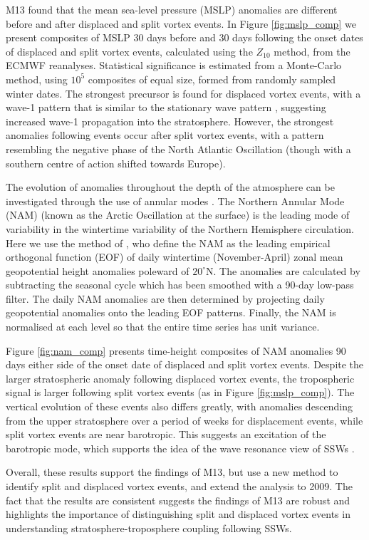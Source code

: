 M13 found that the mean sea-level pressure (MSLP) anomalies are different before
and after displaced and split vortex events. In Figure \ref{fig:mslp_comp} we
present composites of MSLP 30 days before and 30 days following the onset dates
of displaced and split vortex events, calculated using the $Z_{10}$ method, from
the ECMWF reanalyses. Statistical significance is estimated from a Monte-Carlo
method, using $10^{5}$ composites of equal size, formed from randomly sampled
winter dates. The strongest precursor is found for displaced vortex events, with
a wave-1 pattern that is similar to the stationary wave pattern
\citep[e.g.][]{Garfinkel2008}, suggesting increased wave-1 propagation into the
stratosphere. However, the strongest anomalies following events occur after
split vortex events, with a pattern resembling the negative phase of the North
Atlantic Oscillation (though with a southern centre of action shifted towards
Europe).

The evolution of anomalies throughout the depth of the atmosphere can be
investigated through the use of annular modes \citep[e.g.][]{Baldwin2001a}. The
Northern Annular Mode (NAM) (known as the Arctic Oscillation at the surface) is
the leading mode of variability in the wintertime variability of the Northern
Hemisphere circulation. Here we use the method of \citep{Baldwin2009}, who
define the NAM as the leading empirical orthogonal function (EOF) of daily
wintertime (November-April) zonal mean geopotential height anomalies poleward of
$20^{\circ}$N. The anomalies are calculated by subtracting the seasonal cycle
which has been smoothed with a 90-day low-pass filter. The daily NAM anomalies
are then determined by projecting daily geopotential anomalies onto the leading
EOF patterns. Finally, the NAM is normalised at each level so that the entire
time series has unit variance.

Figure \ref{fig:nam_comp} presents time-height composites of NAM anomalies 90
days either side of the onset date of displaced and split vortex events. Despite
the larger stratospheric anomaly following displaced vortex events, the
tropospheric signal is larger following split vortex events (as in Figure
\ref{fig:mslp_comp}). The vertical evolution of these events also differs
greatly, with anomalies descending from the upper stratosphere over a period of
weeks for displacement events, while split vortex events are near
barotropic. This suggests an excitation of the barotropic mode, which supports
the idea of the wave resonance view of SSWs \citep{Esler2005}.

Overall, these results support the findings of M13, but use a new method to
identify split and displaced vortex events, and extend the analysis to 2009. The
fact that the results are consistent suggests the findings of M13 are robust and
highlights the importance of distinguishing split and displaced vortex events in
understanding stratosphere-troposphere coupling following SSWs.






